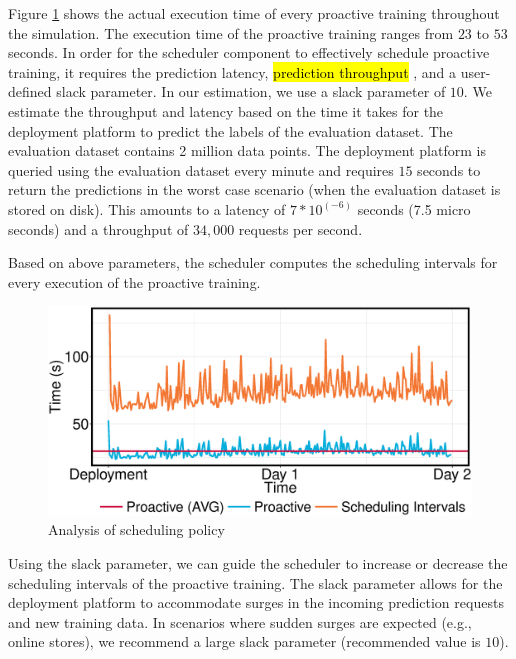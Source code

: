 Figure \ref{fig:scheduling-policy-time} shows the actual execution time of every proactive training throughout the simulation.
The execution time of the proactive training ranges from $23$ to $53$ seconds.
In order for the scheduler component to effectively schedule proactive training, it requires the prediction latency, \hl{prediction throughput} , and a user-defined slack parameter.
In our estimation, we use a slack parameter of $10$.
We estimate the throughput and latency based on the time it takes for the deployment platform to predict the labels of the evaluation dataset.
The evaluation dataset contains 2 million data points.
The deployment platform is queried using the evaluation dataset every minute and requires $15$ seconds to return the predictions in the worst case scenario (when the evaluation dataset is stored on disk). 
This amounts to a latency of $7 * 10 ^ {(-6)}$ seconds (7.5 micro seconds) and a throughput of $34,000$ requests per second.

Based on above parameters, the scheduler computes the scheduling intervals for every execution of the proactive training.

\begin{figure}[h!]
\centering
\includegraphics[width=\columnwidth]{../images/experiment-results/criteo-scheduling-experiment.eps}
\caption{Analysis of scheduling policy}
\label{fig:scheduling-policy-time}
\vspace{2mm}
\end{figure}

Using the slack parameter, we can guide the scheduler to increase or decrease the scheduling intervals of the proactive training.
The slack parameter allows for the deployment platform to accommodate surges in the incoming prediction requests and new training data.
In scenarios where sudden surges are expected (e.g., online stores), we recommend a large slack parameter (recommended value is $10$). 

